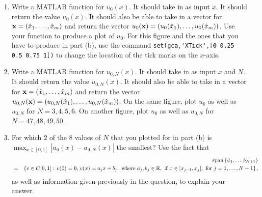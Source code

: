 \begin{enumerate}
\item Write a MATLAB function for $u_0(x)$.  It should take in as input $x$.  It should return the value $u_0(x)$.  It should also be able to take in a vector for ${\bf x}=(\hat{x}_1,\ldots,\hat{x}_m)$ and return the vector $u_0({\bf x})=(u_0(\hat{x}_1),\ldots,u_0(\hat{x}_m))$. Use your function to produce a plot of $u_0$. For this figure and the ones that you have to produce in part (b), use the command \verb|set(gca,'XTick',[0 0.25 0.5 0.75 1])| to change the location of the tick marks on the $x$-axis.

\vspace*{1em}
\item Write a MATLAB function for $u_{0,N}(x)$.  It should take in as input $x$ and $N$.  It should return the value $u_{0,N}(x)$.  It should also be able to take in a vector for ${\bf x}=(\hat{x}_1,\ldots,\hat{x}_m)$ and return the vector $u_{0,N}({\bf x})=(u_{0,N}(\hat{x}_1),\ldots,u_{0,N}(\hat{x}_m))$. On the same figure, plot $u_0$ as well as $u_{0,N}$ for $N=3,4,5,6$. On another figure, plot $u_0$ as well as $u_{0,N}$ for $N=47,48,49,50$.

\vspace*{1em}
\item For which 2 of the 8 values of $N$ that you plotted for in part (b) is $\displaystyle{\max_{x\in[0,1]}|u_0(x)-u_{0,N}(x)|}$ the smallest? Use the fact that
\begin{eqnarray*}
&&{\rm span}\left\{\phi_1,\ldots\phi_{N+1}\right\}
\\
&=&\left\{v\in C[0,1]:\,v(0)=0,\,v(x)=a_jx+b_j,\mbox{ where }a_j,b_j\in\mathbb{R},\mbox{ if }x\in[x_{j-1},x_j],\mbox{ for }j=1,\ldots,N+1\right\},
\end{eqnarray*}
as well as information given previously in the question, to explain your answer.

\end{enumerate}


